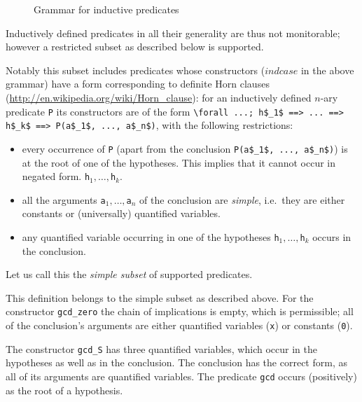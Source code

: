 \begin{figure}[htbp]
  \caption{Grammar for inductive predicates}
\label{fig:gram:inductive}
\end{figure}

{\highlightnotimplemented
Inductively defined predicates in all their generality are thus not
monitorable; however a restricted subset as described below is supported.}

Notably this subset includes predicates whose constructors ($indcase$ in the above grammar) have a form corresponding to definite Horn
clauses
(\url{http://en.wikipedia.org/wiki/Horn_clause}): for an inductively defined
$n$-ary predicate \lstinline|P| its constructors are of the form
\lstinline|\forall ...; h$_1$ ==> ... ==> h$_k$ ==> P(a$_1$, ..., a$_n$)|,
with the following restrictions:
\begin{itemize}
  \item every occurrence of \lstinline|P| (apart from the conclusion
    \lstinline|P(a$_1$, ..., a$_n$)|) is at the root of one of the hypotheses.
    This implies that it cannot occur in negated form.
    \lstinline|h|$_1,\dots,$\lstinline|h|$_k$.
  \item all the arguments \lstinline|a|$_1,\dots,$\lstinline|a|$_n$ of the
    conclusion are \emph{simple}, i.e.\ they are either constants or (universally)
    quantified variables.
  \item any quantified variable occurring in one of the hypotheses
    \lstinline|h|$_1,\dots,$\lstinline|h|$_k$ occurs in the conclusion.
\end{itemize}
Let us call this the \emph{simple subset} of supported predicates.

\begin{example}[supported]
  This definition belongs to the simple subset as described above.
  For the constructor \lstinline|gcd_zero| the chain of implications is empty,
  which is permissible; all of the conclusion's arguments are either
  quantified variables (\lstinline|x|) or constants (\lstinline|0|).

  The constructor \lstinline|gcd_S| has three quantified variables, which
  occur in the hypotheses as well as in the conclusion. The conclusion has the
  correct form, as all of its arguments are quantified variables. The
  predicate \lstinline|gcd| occurs (positively) as the root of a hypothesis.
\end{example}

